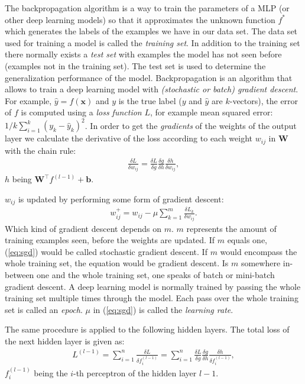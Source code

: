 \documentclass[]{article}
\begin{document}
The backpropagation algorithm is a way to train the parameters of a
MLP (or other deep learning models) so that it approximates the
unknown function $f^*$ which generates the labels of the examples
we have in our data set.
The data set used for training a model is called the \textit{training
set}.
In addition to the training set there normally exists a
\textit{test set} with examples the model has not seen before
(examples not in the training set).
The test set is used to determine the generalization performance of
the model.
Backpropagation is an algorithm that allows to train a deep learning
model with \textit{(stochastic or batch) gradient descent}.
For example, $\hat{y} = f(\mathbf{x})$ and $y$ is the true label
($y$ and $\hat{y}$ are $k$-vectors), the error of $f$ is computed
using a \textit{loss function} $L$, for example mean squared error:
$1/k \sum_{i=1}^{k}(y_k - \hat{y}_k)^2$.
In order to get the \textit{gradients} of the weights of the output
layer we calculate the derivative of the loss according to each weight
$w_{ij}$ in $\mathbf{W}$ with the chain rule:
\begin{align}
  \label{eq:chain_rule}
  \frac{\delta L}{\delta w_{ij}} =
    \frac{\delta L}{\delta g}
    \frac{\delta g}{\delta h}
    \frac{\delta h}{\delta w_{ij}},
\end{align}
$h$ being $\mathbf{W}^\top f^{(l-1)} + \mathbf{b}$.

$w_{ij}$ is updated by performing some form of gradient descent:
\begin{align}
  \label{eq:sgd}
  w_{ij}^+ = w_{ij} - \mu \sum_{k=1}^{m} \frac{\delta L_k}{\delta w_{ij}}.
\end{align}
Which kind of gradient descent depends on $m$.
$m$ represents the amount of training examples seen, before the
weights are updated.
If $m$ equals one, (\ref{eq:sgd}) would be called stochastic gradient
descent.
If $m$ would encompass the whole training set, the equation would
be gradient descent.
Is $m$ somewhere in-between one and the whole training set, one
speaks of batch or mini-batch gradient descent.
A deep learning model is normally trained by passing the whole
training set multiple times through the model.
Each pass over the whole training set is called an \textit{epoch}.
$\mu$ in (\ref{eq:sgd}) is called the \textit{learning rate}.

The same procedure is applied to the following hidden layers.
The total loss of the next hidden layer is given as:
\begin{align}
  L^{(l-1)} = \sum_{i=1}^n\frac{\delta L}{\delta f^{(l - 1)}_i} =
  \sum_{i=1}^n\frac{\delta L}{\delta g}
    \frac{\delta g}{\delta h}
    \frac{\delta h}{\delta f^{(l - 1)}_i},
\end{align}
$f^{(l-1)}_i$ being the $i$-th perceptron of the hidden layer $l-1$.
\end{document}
